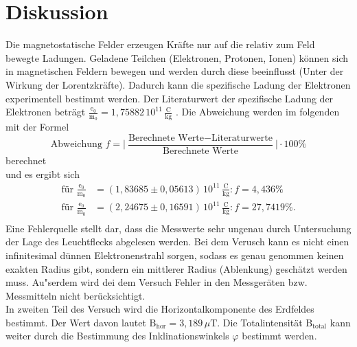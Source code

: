 \section{Diskussion}
Die magnetostatische Felder erzeugen Kräfte nur auf die relativ zum Feld bewegte Ladungen.
Geladene Teilchen (Elektronen, Protonen, Ionen) können sich in magnetischen Feldern bewegen und werden durch diese beeinflusst (Unter der Wirkung der Lorentzkräfte).
Dadurch kann die spezifische Ladung der Elektronen experimentell bestimmt werden.
Der Literaturwert der spezifische Ladung der Elektronen beträgt \(\frac{\text{e}_0}{\text{m}_0}=1,75882\,10^{11}\,\mathrm{\frac{C}{kg}}\) \cite{LT}.
Die Abweichung werden im folgenden mit der Formel
\begin{equation}
    \text{Abweichung $f$} = \Big\vert\frac{\text{Berechnete Werte} - \text{Literaturwerte}}{\text{Berechnete Werte}}\Big\vert \cdot 100 \%
\end{equation} berechnet\\
und es ergibt sich 
\begin{align*}
  \text{für}\,\, \frac{\text{e}_0}{\text{m}_0} &=(1,83685 \pm 0,05613)\, 10^{11}\,\mathrm{\frac{C}{kg}} : f=4,436\%\\
  \text{für}\,\, \frac{\text{e}_0}{\text{m}_0}& =(2,24675 \pm 0,16591)\,10^{11}\,\mathrm{\frac{C}{kg}}: f= 27,7419\% .\\
   \end{align*}
Eine Fehlerquelle stellt dar, dass die Messwerte sehr ungenau durch Untersuchung der Lage des Leuchtflecks abgelesen werden. 
Bei dem Verusch kann es nicht einen infinitesimal dünnen Elektronenstrahl sorgen, sodass es
genau genommen keinen exakten Radius gibt, sondern ein mittlerer Radius (Ablenkung) geschätzt werden muss.
Au"serdem wird dei dem Versuch Fehler in den Messgeräten bzw. Messmitteln nicht berücksichtigt.\\

\noindent In zweiten Teil des Versuch wird die Horizontalkomponente des Erdfeldes bestimmt.
 Der Wert davon lautet $\text{B}_{\text{hor}}=3,189 \,\mu \text{T}$.
 Die Totalintensität $\text{B}_{\text{total}}$ kann weiter durch die Bestimmung des  Inklinationswinkels $\varphi$ bestimmt werden.


\label{sec:Diskussion}
